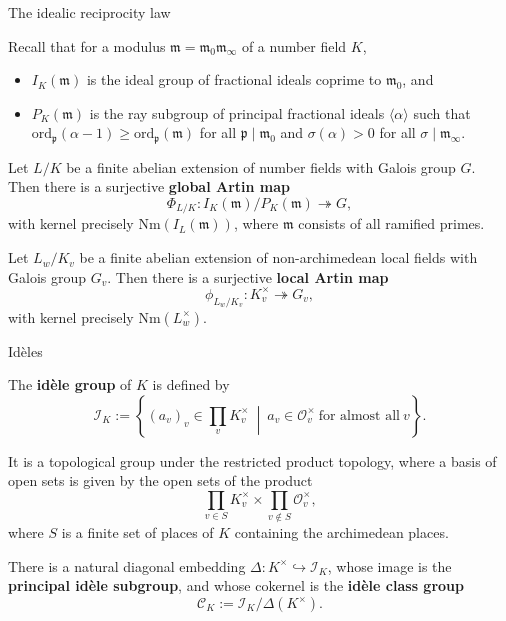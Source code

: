 \documentclass[10pt]{beamer}
\begin{document}
\begin{frame}[t]{The idealic reciprocity law}

Recall that for a modulus $ \mathfrak{m} = \mathfrak{m}_0\mathfrak{m}_\infty $ of a number field $ K $,
\begin{itemize}
\item $ I_K(\mathfrak{m}) $ is the ideal group of fractional ideals coprime to $ \mathfrak{m}_0 $, and
\item $ P_K(\mathfrak{m}) $ is the ray subgroup of principal fractional ideals $ \langle\alpha\rangle $ such that $ \mathrm{ord}_\mathfrak{p}(\alpha - 1) \ge \mathrm{ord}_\mathfrak{p}(\mathfrak{m}) $ for all $ \mathfrak{p} \mid \mathfrak{m}_0 $ and $ \sigma(\alpha) > 0 $ for all $ \sigma \mid \mathfrak{m}_\infty $.
\end{itemize}

\pause

\begin{theorem}
Let $ L / K $ be a finite abelian extension of number fields with Galois group $ G $. Then there is a surjective \textbf{global Artin map}
$$ \Phi_{L / K} : I_K(\mathfrak{m}) / P_K(\mathfrak{m}) \twoheadrightarrow G, $$
with kernel precisely $ \mathrm{Nm}(I_L(\mathfrak{m})) $, where $ \mathfrak{m} $ consists of all ramified primes.
\end{theorem}

\pause

\begin{theorem}
Let $ L_w / K_v $ be a finite abelian extension of non-archimedean local fields with Galois group $ G_v $. Then there is a surjective \textbf{local Artin map}
$$ \phi_{L_w / K_v} : K_v^\times \twoheadrightarrow G_v, $$
with kernel precisely $ \mathrm{Nm}(L_w^\times) $.
\end{theorem}

\end{frame}

\begin{frame}[t]{Id\`eles}

The \textbf{id\`ele group} of $ K $ is defined by
$$ \mathcal{I}_K := \left\{(a_v)_v \in \prod_v K_v^\times \ \middle| \ a_v \in \mathcal{O}_v^\times \ \text{for almost all} \ v\right\}. $$

\pause

It is a topological group under the restricted product topology, where a basis of open sets is given by the open sets of the product
$$ \prod_{v \in S} K_v^\times \times \prod_{v \notin S} \mathcal{O}_v^\times, $$
where $ S $ is a finite set of places of $ K $ containing the archimedean places.

\pause

\vspace{0.5cm} There is a natural diagonal embedding $ \Delta : K^\times \hookrightarrow \mathcal{I}_K $, whose image is the \textbf{principal id\`ele subgroup}, and whose cokernel is the \textbf{id\`ele class group}
$$ \mathcal{C}_K := \mathcal{I}_K / \Delta(K^\times). $$

\end{frame}
\end{document}
